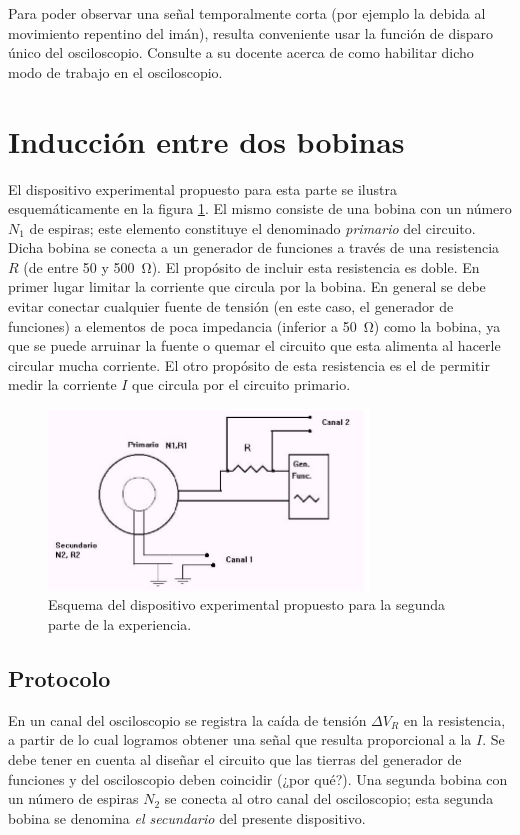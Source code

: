 \documentclass[laboratorio]{guia}
\begin{document}
Para poder observar una señal temporalmente corta (por ejemplo la debida al movimiento repentino del imán), resulta conveniente usar la función de disparo único del osciloscopio.
Consulte a su docente acerca de como habilitar dicho modo de trabajo en el osciloscopio.


\section{Inducción entre dos bobinas}
El dispositivo experimental propuesto para esta parte se ilustra esquemáticamente en la figura \ref{fig:1}.
El mismo consiste de una bobina con un número $N_1$ de espiras; este elemento constituye el denominado {\it primario} del circuito.
Dicha bobina se conecta a un generador de funciones a través de una resistencia $R$ (de entre 50 y \SI{500}{\ohm}).
El propósito de incluir esta resistencia es doble.
En primer lugar limitar la corriente que circula por la bobina.
En general se debe evitar conectar cualquier fuente de tensión (en este caso, el generador de funciones) a elementos de poca impedancia (inferior a \SI{50}{\ohm}) como la bobina, ya que se puede arruinar la fuente o quemar el circuito que esta alimenta al hacerle circular mucha corriente.
El otro propósito de esta resistencia es el de permitir medir la corriente $I$ que circula por el circuito primario. 

\begin{figure}[t!]
    \centering
    \includegraphics[width=8.5cm]{LG04--000.png}
    \caption{Esquema del dispositivo experimental propuesto para la segunda
    parte de la experiencia.}
    \label{fig:1}
\end{figure}

\subsection{Protocolo}
En un canal del osciloscopio se registra la caída de tensión $\Delta V_R$ en la resistencia, a partir de lo cual logramos obtener una señal que resulta proporcional a la \(I\).
Se debe tener en cuenta al diseñar el circuito que las tierras del generador de funciones y del osciloscopio deben coincidir (¿por qué?).
Una segunda bobina con un número de espiras $N_2$ se conecta al otro canal del osciloscopio; esta segunda bobina se denomina {\it el secundario} del presente dispositivo.
\end{document}
